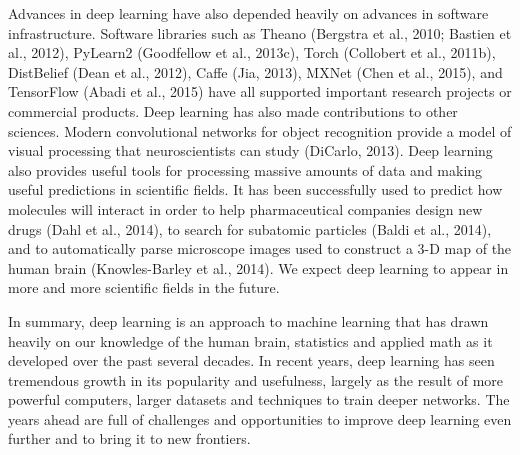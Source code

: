\documentclass[11pt]{article}
\begin{document}
Advances in deep learning have also depended heavily on advances in software infrastructure.
Software libraries such as Theano (Bergstra et al., 2010; Bastien et al., 2012), PyLearn2 (Goodfellow et al., 2013c), Torch (Collobert et al., 2011b), DistBelief (Dean et al., 2012), Caﬀe (Jia, 2013), MXNet (Chen et al., 2015), and TensorFlow (Abadi et al., 2015) have all supported important research projects or commercial products.
Deep learning has also made contributions to other sciences.
Modern convolutional networks for object recognition provide a model of visual processing that neuroscientists can study (DiCarlo, 2013).
Deep learning also provides useful tools for processing massive amounts of data and making useful predictions in scientific fields.
It has been successfully used to predict how molecules will interact in order to help pharmaceutical companies design new drugs (Dahl et al., 2014), to search for subatomic particles (Baldi et al., 2014), and to automatically parse microscope images used to construct a 3-D map of the human brain (Knowles-Barley et al., 2014).
We expect deep learning to appear in more and more scientific fields in the future.

In summary, deep learning is an approach to machine learning that has drawn heavily on our knowledge of the human brain, statistics and applied math as it developed over the past several decades.
In recent years, deep learning has seen tremendous growth in its popularity and usefulness, largely as the result of more powerful computers, larger datasets and techniques to train deeper networks.
The years ahead are full of challenges and opportunities to improve deep learning even further and to bring it to new frontiers.
\end{document}
